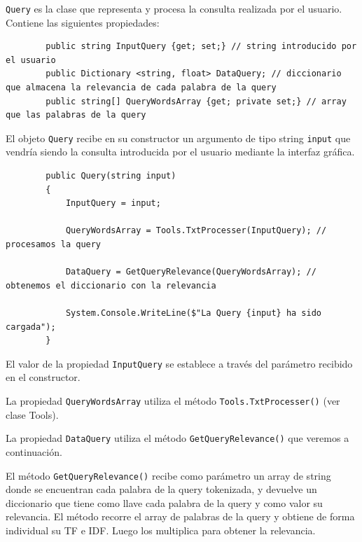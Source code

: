 \documentclass[12pt,a4paper]{report}
\begin{document}
\texttt{Query} es la clase que representa y procesa la consulta realizada por el usuario. Contiene las siguientes propiedades:\par
\begin{lstlisting}
        public string InputQuery {get; set;} // string introducido por el usuario
        public Dictionary <string, float> DataQuery; // diccionario que almacena la relevancia de cada palabra de la query
        public string[] QueryWordsArray {get; private set;} // array que las palabras de la query
\end{lstlisting}\bigskip

El objeto \texttt{Query} recibe en su constructor un argumento de tipo string \texttt{input} que vendría siendo la consulta introducida por el usuario mediante la interfaz gráfica.\par

\begin{lstlisting}
        public Query(string input)
        {
            InputQuery = input;

            QueryWordsArray = Tools.TxtProcesser(InputQuery); // procesamos la query

            DataQuery = GetQueryRelevance(QueryWordsArray); // obtenemos el diccionario con la relevancia
        
            System.Console.WriteLine($"La Query {input} ha sido cargada");
        }

\end{lstlisting}\bigskip

El valor de la propiedad \texttt{InputQuery} se establece a través del parámetro recibido en el constructor.\par
La propiedad \texttt{QueryWordsArray} utiliza el método \texttt{Tools.TxtProcesser()} (ver clase Tools).\par
La propiedad \texttt{DataQuery} utiliza el método \texttt{GetQueryRelevance()} que veremos a continuación.\par\bigskip

El método \texttt{GetQueryRelevance()} recibe como parámetro un array de string donde se encuentran cada palabra de la query tokenizada, y devuelve un diccionario que tiene como llave cada palabra de la query y como valor su relevancia.
El método recorre el array de palabras de la query y obtiene de forma individual su TF e IDF. Luego los multiplica para obtener la relevancia.\par 
\end{document}
